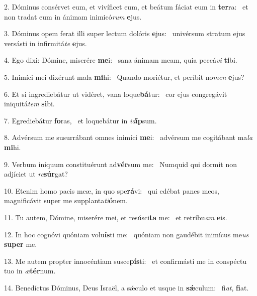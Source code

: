 2. Dóminus consérvet eum, et vivíficet eum, et beátum fáciat eum in \textbf{ter}ra: \ast\  et non tradat eum in ánimam inimicó\textit{rum} \textbf{e}jus.\

3. Dóminus opem ferat illi super lectum dolóris \textbf{e}jus: \ast\  univérsum stratum ejus versásti in infirmitá\textit{te} \textbf{e}jus.\

4. Ego dixi: Dómine, miserére \textbf{me}i: \ast\  sana ánimam meam, quia peccá\textit{vi} \textbf{ti}bi.\

5. Inimíci mei dixérunt mala \textbf{mi}hi: \ast\  Quando moriétur, et períbit no\textit{men} \textbf{e}jus?\

6. Et si ingrediebátur ut vidéret, vana loque\textbf{bá}tur: \ast\  cor ejus congregávit iniquitá\textit{tem} \textbf{si}bi.\

7. Egrediebátur \textbf{fo}ras, \ast\  et loquebátur in \textit{id}\textbf{íp}sum.\

8. Advérsum me susurrábant omnes inimíci \textbf{me}i: \ast\  advérsum me cogitábant ma\textit{la} \textbf{mi}hi.\

9. Verbum iníquum constituérunt ad\textbf{vér}sum me: \ast\  Numquid qui dormit non adjíciet ut \textit{re}\textbf{súr}gat?\

10. Etenim homo pacis meæ, in quo spe\textbf{rá}vi: \ast\  qui edébat panes meos, magnificávit super me supplanta\textit{ti}\textbf{ó}nem.\

11. Tu autem, Dómine, miserére mei, et resúsci\textbf{ta} me: \ast\  et retríbu\textit{am} \textbf{e}is.\

12. In hoc cognóvi quóniam volu\textbf{ís}ti me: \ast\  quóniam non gaudébit inimícus me\textit{us} \textbf{su}\textbf{per} me.\

13. Me autem propter innocéntiam susce\textbf{pís}ti: \ast\  et confirmásti me in conspéctu tuo in \textit{æ}\textbf{tér}num.\

14. Benedíctus Dóminus, Deus Israël, a sǽculo et usque in \textbf{sǽ}culum: \ast\  fi\textit{at}, \textbf{fi}at.\


